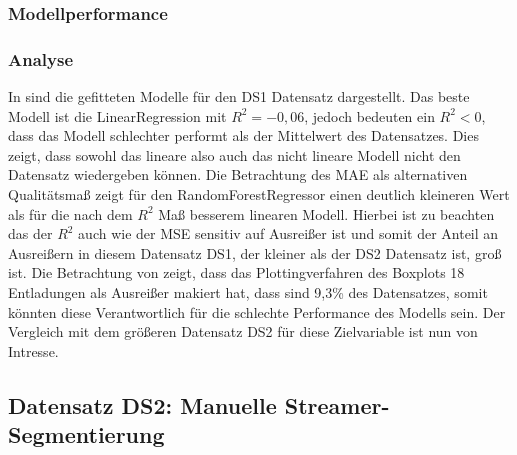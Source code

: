 \subsubsection{Modellperformance}

\begin{table}[h!]
\centering
\caption{Model Performance für die Vorhersage der Vorläuferabstände}
\label{tab:prec_distance}
\end{table}

\subsubsection{Analyse}
\label{sec:ds1ana}
In  sind die gefitteten Modelle für den DS1 Datensatz dargestellt. Das beste Modell ist die LinearRegression mit \(R^2 = -0,06\), jedoch bedeuten ein \(R^2 < 0\), dass das Modell schlechter performt als der Mittelwert des Datensatzes. Dies zeigt, dass sowohl das lineare also auch das nicht lineare Modell nicht den Datensatz wiedergeben können. Die Betrachtung des MAE als alternativen Qualitätsmaß zeigt für den RandomForestRegressor einen deutlich kleineren Wert als für die nach dem \(R^2\) Maß besserem linearen Modell. Hierbei ist zu beachten das der \(R^2\) auch wie der MSE sensitiv auf Ausreißer ist und somit der Anteil an Ausreißern in diesem Datensatz DS1, der kleiner als der DS2 Datensatz ist, groß ist. Die Betrachtung von  zeigt, dass das Plottingverfahren des Boxplots 18 Entladungen als Ausreißer makiert hat, dass sind 9,3\% des Datensatzes, somit könnten diese Verantwortlich für die schlechte Performance des Modells sein. Der Vergleich mit dem größeren Datensatz DS2 für diese Zielvariable ist nun von Intresse.

\subsection{Datensatz DS2: Manuelle Streamer-Segmentierung}

